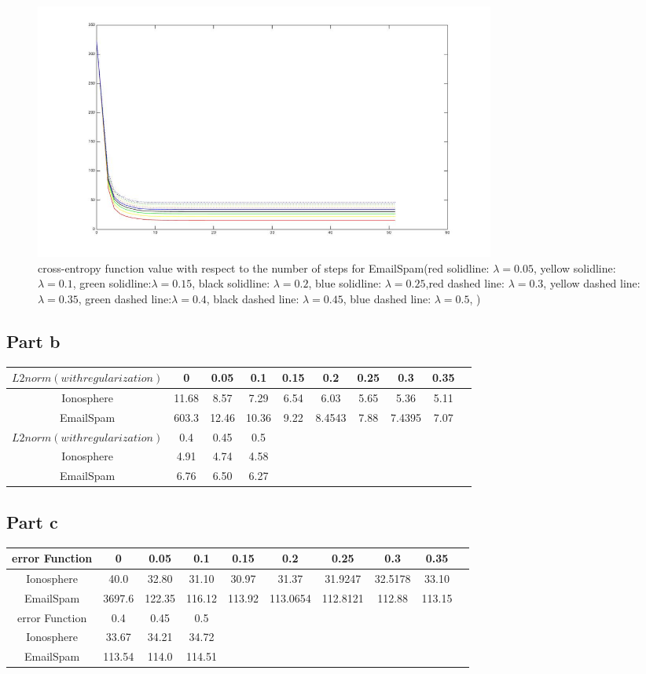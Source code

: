 \documentclass[11pt]{article}
\numberwithin{equation}{section}
\begin{document}
	\begin{figure} [H] 
    	\includegraphics[width=6in]{Q7_spam} 
    	\caption{ cross-entropy function  value with respect to the number of steps for EmailSpam(red solidline: $\lambda = 0.05$, yellow solidline: $\lambda = 0.1$, green solidline:$\lambda = 0.15$, black solidline: $\lambda = 0.2$, blue solidline: $\lambda = 0.25$,red dashed line: $\lambda = 0.3$, yellow dashed line: $\lambda = 0.35$, green dashed line:$\lambda = 0.4$, black dashed line: $\lambda = 0.45$, blue dashed line: $\lambda = 0.5$, )} 
    	\label{fig:side:a} 
	\end{figure}
	
	\subsection{Part b}
	\begin{tabular}{|c|c|c|c|c|c|c|c|c|c|}
	\hline
	$L2 norm (with regularization)$& 0& 0.05& 0.1& 0.15& 0.2& 0.25& 0.3& 0.35\\
	\hline
	Ionosphere& 11.68& 8.57& 7.29& 6.54& 6.03& 5.65& 5.36& 5.11\\
	\hline	
	EmailSpam& 603.3& 12.46& 10.36& 9.22& 8.4543& 7.88& 7.4395& 7.07\\	
	\hline
	$L2 norm (with regularization)$& 0.4& 0.45& 0.5\\
	\hline
	Ionosphere& 4.91& 4.74& 4.58\\
	\hline
	EmailSpam& 6.76& 6.50& 6.27\\
	\hline
	\end{tabular}

	
	\subsection{Part c}
	\begin{tabular}{|c|c|c|c|c|c|c|c|c|c|}
	\hline
	error Function & 0& 0.05& 0.1& 0.15& 0.2& 0.25& 0.3& 0.35\\
	\hline
	Ionosphere& 40.0& 32.80& 31.10& 30.97& 31.37& 31.9247& 32.5178& 33.10\\
	\hline	
	EmailSpam& 3697.6& 122.35& 116.12& 113.92& 113.0654& 112.8121& 112.88& 113.15\\	
	\hline
	error Function & 0.4& 0.45& 0.5\\
	\hline
	Ionosphere& 33.67& 34.21& 34.72\\
	\hline
	EmailSpam& 113.54& 114.0& 114.51\\
	\hline
	\end{tabular}
\end{document}
